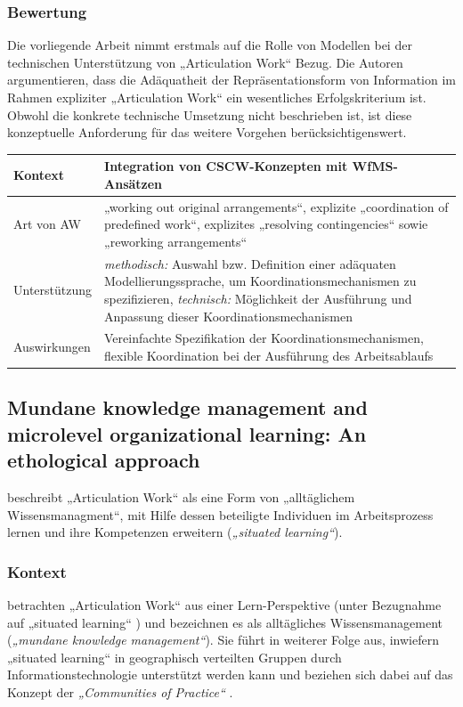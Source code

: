\subsubsection{Bewertung}

Die vorliegende Arbeit nimmt erstmals auf die Rolle von Modellen bei der technischen Unterstützung von „Articulation Work“ Bezug. Die Autoren argumentieren, dass die Adäquatheit der Repräsentationsform von Information im Rahmen expliziter „Articulation Work“ ein wesentliches Erfolgskriterium ist. Obwohl die konkrete technische Umsetzung nicht beschrieben ist, ist diese konzeptuelle Anforderung für das weitere Vorgehen berücksichtigenswert.
\\[1em]
\begin{tabular}{| p{3cm} | p{10cm} |}
  \hline
  Kontext & Integration von \gls{CSCW}-Konzepten mit \gls{WfMS}-Ansätzen \\ \hline
  Art von AW & „working out original arrangements“, explizite „coordination of predefined work“, explizites „resolving contingencies“ sowie „reworking arrangements“  \\ \hline
  Unterstützung & \emph{methodisch:} Auswahl bzw. Definition einer adäquaten Modellierungssprache, um Koordinationsmechanismen zu spezifizieren, \emph{technisch:} Möglichkeit der Ausführung und Anpassung dieser Koordinationsmechanismen \\ \hline
  Auswirkungen & Vereinfachte Spezifikation der Koordinationsmechanismen, flexible Koordination bei der Ausführung des Arbeitsablaufs\\ \hline
\end{tabular}

\subsection{Mundane knowledge management and microlevel organizational learning: An ethological approach}

\citet{Davenport02} beschreibt „Articulation Work“ als eine Form von „alltäglichem Wissensmanagment“, mit Hilfe dessen beteiligte Individuen im Arbeitsprozess lernen und ihre Kompetenzen erweitern (\emph{„situated learning“}).

\subsubsection{Kontext}

\citet{Davenport02} betrachten „Articulation Work“ aus einer Lern-Perspektive (unter Bezugnahme auf „situated learning“ \citep{Lave91}) und bezeichnen es als alltägliches Wissensmanagement (\emph{„mundane knowledge management“}). Sie führt in weiterer Folge aus, inwiefern „situated learning“ in geographisch verteilten Gruppen durch Informationstechnologie unterstützt werden kann und beziehen sich dabei auf das Konzept der \emph{„Communities of Practice“} \citep{Wenger99}. 

